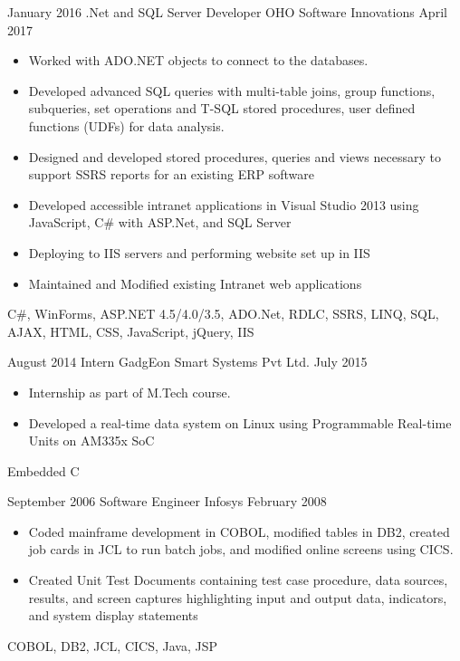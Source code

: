 \begin{experiences}
    \experience
        {January 2016}
        {.Net and SQL Server Developer}
        {OHO Software Innovations}
        {April 2017}
        {
            \begin{itemize}
                \item Worked with ADO.NET objects to connect to the databases.
                \item Developed advanced SQL queries with multi-table joins, group functions, subqueries, set operations and T-SQL stored procedures, user defined functions (UDFs) for data analysis.
                \item Designed and developed stored procedures, queries and views necessary to support SSRS reports for an existing ERP software
                \item Developed accessible intranet applications in Visual Studio 2013 using JavaScript, C# with ASP.Net, and SQL Server
                \item Deploying to IIS servers and performing website set up in IIS
                \item Maintained and Modified existing Intranet web applications
            \end{itemize}
        }
        {
            C\#,
            WinForms,
            ASP.NET 4.5/4.0/3.5,
            ADO.Net,
            RDLC,
            SSRS,
            LINQ,
            SQL,
            AJAX,
            HTML, 
            CSS, 
            JavaScript,
            jQuery,
            IIS
        }

    \emptySeparator

    \experience
        {August 2014}
        {Intern}
        {GadgEon Smart Systems Pvt Ltd.}
        {July 2015}
        {
            \begin{itemize}
                \item Internship as part of M.Tech course.
                \item Developed a real-time data system on Linux using Programmable Real-time Units on AM335x SoC
            \end{itemize}
        }
        {
            Embedded C
        }

    \emptySeparator

    \experience
        {September 2006}
        {Software Engineer}
        {Infosys}
        {February 2008}
        {
            \begin{itemize}
                \item Coded mainframe development in COBOL, modified tables in DB2, created job cards in JCL to run batch jobs, and modified online screens using CICS.
                \item Created Unit Test Documents containing test case procedure, data sources, results, and screen captures highlighting input and output data, indicators, and system display statements
            \end{itemize}
        }
        {
            COBOL, 
            DB2,
            JCL, 
            CICS, 
            Java, 
            JSP
        }

\end{experiences}
